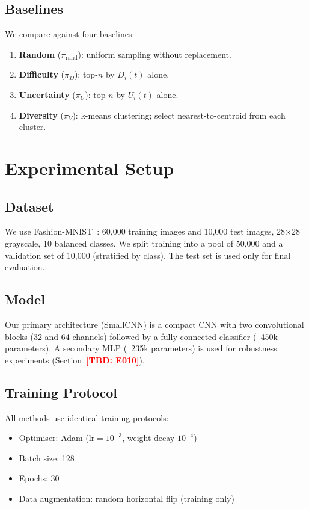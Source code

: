 \documentclass[10pt,twocolumn]{article}
\newcommand{\tbd}[1]{\textcolor{red}{\textbf{[TBD: #1]}}}
\begin{document}
\subsection{Baselines}

We compare against four baselines:
\begin{enumerate}
  \item \textbf{Random} ($\pi_\text{rand}$): uniform sampling without replacement.
  \item \textbf{Difficulty} ($\pi_D$): top-$n$ by $D_i(t)$ alone.
  \item \textbf{Uncertainty} ($\pi_U$): top-$n$ by $U_i(t)$ alone.
  \item \textbf{Diversity} ($\pi_V$): k-means clustering; select nearest-to-centroid from each cluster.
\end{enumerate}

\section{Experimental Setup}
\label{sec:setup}

\subsection{Dataset}
We use Fashion-MNIST~\citep{xiao2017fashionmnist}: 60,000 training images
and 10,000 test images, 28$\times$28 grayscale, 10 balanced classes.
We split training into a pool of 50,000 and a validation set of 10,000
(stratified by class). The test set is used only for final evaluation.

\subsection{Model}
Our primary architecture (SmallCNN) is a compact CNN with two
convolutional blocks (32 and 64 channels) followed by a fully-connected
classifier (~450k parameters). A secondary MLP (~235k parameters) is used
for robustness experiments (Section~\tbd{E010}).

\subsection{Training Protocol}
All methods use identical training protocols:
\begin{itemize}
  \item Optimiser: Adam ($\text{lr}=10^{-3}$, weight decay $10^{-4}$)
  \item Batch size: 128
  \item Epochs: 30
  \item Data augmentation: random horizontal flip (training only)
\end{itemize}
\end{document}
